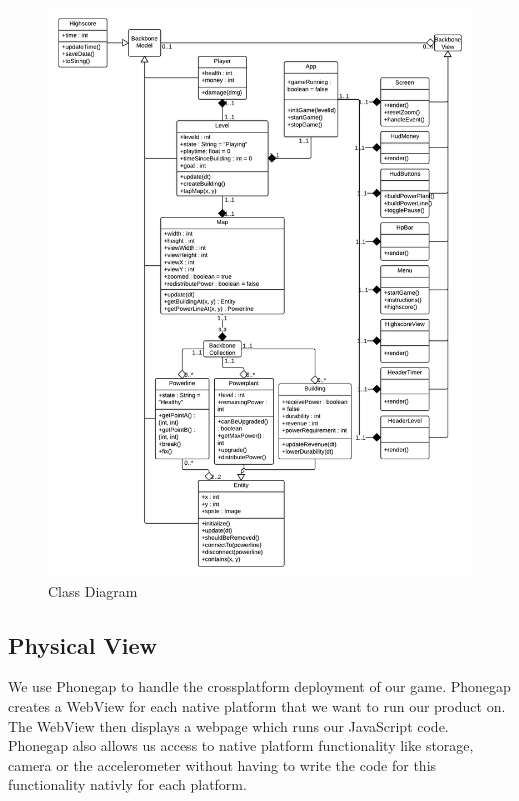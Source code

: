 	\begin{figure}[H]
		\begin{adjustwidth}{-50em}{-50em}
			\centering
			\includegraphics[scale=0.28]{pictures/class_diagram}
		\end{adjustwidth}
		\caption{Class Diagram}
	\end{figure}

	\newpage

\subsection*{Physical View}

	We use Phonegap to handle the crossplatform deployment of our game. Phonegap creates a WebView for
	each native platform that we want to run our product on. The WebView then displays a webpage which
	runs our JavaScript code. Phonegap also allows us access to native platform functionality like
	storage, camera or the accelerometer without having to write the code for this functionality nativly
	for each platform.

